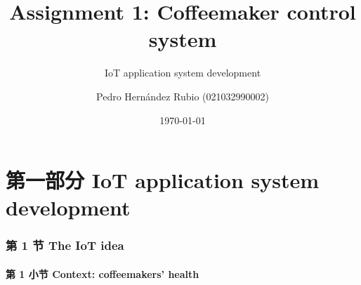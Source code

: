 \documentclass[
    aspectratio=169,                   %
]{beamer}
\begin{document}
    \title{Assignment 1: Coffeemaker control system}  %
    \subtitle{IoT application system development}         %
    \author{Pedro Hernández Rubio (021032990002)}                  %
    \date{\today}                          %
    \maketitle                             %

\part{第一部分 IoT application system development}

\AtBeginSection[]{
    \begin{frame}
        \sectionpage                   %
    \end{frame}
}


\section{第 1 节 The IoT idea}

\subsection{第 1 小节 Context: coffeemakers' health}
\end{document}
